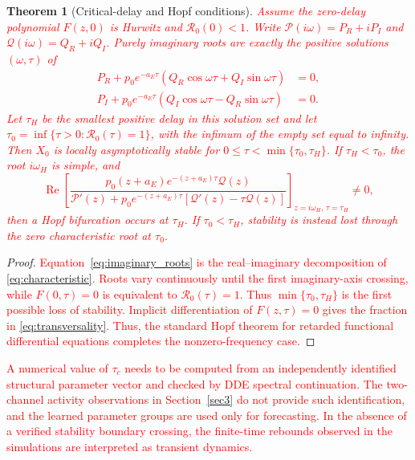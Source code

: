 \documentclass[letterpaper,journal]{IEEEtran}
\newtheorem{theorem}{Theorem}[section]
\begin{document}
	\begin{theorem}[Critical-delay and Hopf conditions]
		\textcolor{red}{
		Assume the zero-delay polynomial $F(z,0)$ is Hurwitz and $\mathcal R_0(0)<1$. Write $\mathcal P(i\omega)=P_R+iP_I$ and $\mathcal Q(i\omega)=Q_R+iQ_I$. Purely imaginary roots are exactly the positive solutions $(\omega,\tau)$ of
		\begin{align}
		P_R+p_0e^{-a_E\tau}(Q_R\cos\omega\tau+Q_I\sin\omega\tau)&=0,\nonumber\\
		P_I+p_0e^{-a_E\tau}(Q_I\cos\omega\tau-Q_R\sin\omega\tau)&=0.
		\label{eq:imaginary_roots}
		\end{align}
		Let $\tau_H$ be the smallest positive delay in this solution set and let
		$\tau_0=\inf\{\tau>0:\mathcal R_0(\tau)=1\}$, with the infimum of the empty set equal to infinity. Then $X_0$ is locally asymptotically stable for
		$0\leq\tau<\min\{\tau_0,\tau_H\}$. If $\tau_H<\tau_0$, the root
		$i\omega_H$ is simple, and
		\begin{equation}
		\operatorname{Re}\!\left[
		\frac{p_0(z+a_E)e^{-(z+a_E)\tau}\mathcal Q(z)}
		{\mathcal P'(z)+p_0e^{-(z+a_E)\tau}[\mathcal Q'(z)-\tau\mathcal Q(z)]}
		\right]_{z=i\omega_H,\,\tau=\tau_H}\neq0,
		\label{eq:transversality}
		\end{equation}
		then a Hopf bifurcation occurs at $\tau_H$. If $\tau_0<\tau_H$, stability is instead lost through the zero characteristic root at $\tau_0$.}
	\end{theorem}
	\begin{proof}
		\textcolor{red}{Equation~\eqref{eq:imaginary_roots} is the real--imaginary decomposition of \eqref{eq:characteristic}. Roots vary continuously until the first imaginary-axis crossing, while $F(0,\tau)=0$ is equivalent to $\mathcal R_0(\tau)=1$. Thus $\min\{\tau_0,\tau_H\}$ is the first possible loss of stability. Implicit differentiation of $F(z,\tau)=0$ gives the fraction in \eqref{eq:transversality}. Thus, the standard Hopf theorem for retarded functional differential equations \cite{hale1993functional} completes the nonzero-frequency case.}
	\end{proof}

	\textcolor{red}{
	A numerical value of $\tau_c$ needs to be computed from an independently identified structural parameter vector and checked by DDE spectral continuation. The two-channel activity observations in Section~\ref{sec3} do not provide such identification, and the learned parameter groups are used only for forecasting. In the absence of a verified stability boundary crossing, the finite-time rebounds observed in the simulations are interpreted as transient dynamics.
	}
\end{document}
